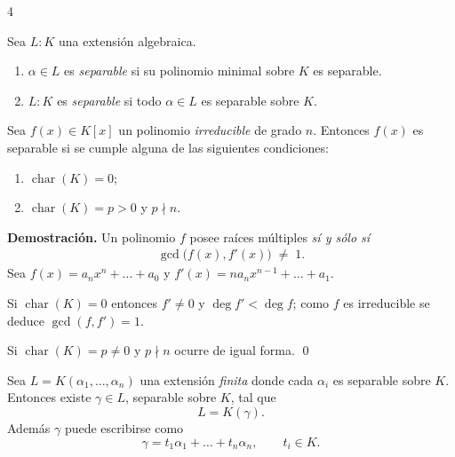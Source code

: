 \documentclass[landscape,a4paper]{article}
\begin{document}
\begin{multicols}{4}
\begin{tcolorbox}[colback=white,colframe=blue!80!black,
                  colbacktitle=blue!80!black,coltitle=white,
                  title=Definición: {Elemento y extensión separables (p.~1, col.~2)}]
Sea $L:K$ una extensión algebraica.
\begin{enumerate}
  \item $\alpha\in L$ es \emph{separable} si su polinomio minimal sobre $K$ es separable.
  \item $L:K$ es \emph{separable} si todo $\alpha\in L$ es separable sobre $K$.
\end{enumerate}
\end{tcolorbox}
\begin{tcolorbox}[colback=white,colframe=red!80!black,
                  colbacktitle=red!80!black,coltitle=white,
                  title={Proposición (p.~2, col.~1)}]
Sea $f(x)\in K[x]$ un polinomio \emph{irreducible} de grado $n$. Entonces $f(x)$ es separable si se cumple alguna de las siguientes condiciones:
\begin{enumerate}
  \item $\operatorname{char}(K)=0$;
  \item $\operatorname{char}(K)=p>0$ y $p\nmid n$.
\end{enumerate}
\end{tcolorbox}

\noindent \textbf{Demostración.} Un polinomio $f$ posee raíces múltiples \emph{sí y sólo sí}
\begin{align}
\gcd\!\bigl(f(x),f'(x)\bigr)\;\neq\;1. \tag*{(p.~2, col.~1)}
\end{align}
Sea $f(x)=a_nx^{n}+\dots+a_0$ y $f'(x)=na_nx^{n-1}+\dots+a_1$.  

Si $\operatorname{char}(K)=0$ entonces $f'\neq 0$ y $\deg f'<\deg f$; como $f$ es irreducible se deduce $\gcd(f,f')=1$.  

Si $\operatorname{char}(K)=p\neq 0$ y $p\nmid n$ ocurre de igual forma. \qed
\begin{tcolorbox}[colback=white,colframe=red!80!black,
                  colbacktitle=red!80!black,coltitle=white,
                  title={Teorema: Elemento primitivo (p.~3, col.~1)}]
Sea $L = K(\alpha_1,\dots,\alpha_n)$ una extensión \emph{finita} donde cada $\alpha_i$ es separable sobre $K$. Entonces existe $\gamma\in L$, separable sobre $K$, tal que
\[
L = K(\gamma).
\]
Además $\gamma$ puede escribirse como
\[
\gamma = t_1\alpha_1+\dots+t_n\alpha_n,\qquad t_i\in K.
\]
\end{tcolorbox}


\end{multicols}
\end{document}
